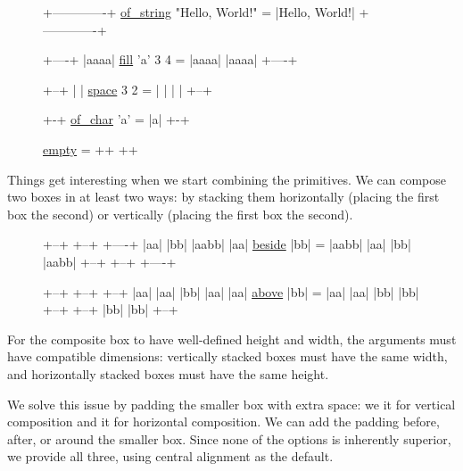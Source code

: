\documentclass{article}
\begin{document}
\begin{figure}
\begin{code}
                            +-------------+
\href{#ref-of-string}{of_string} "Hello, World!" = |Hello, World!|
                            +-------------+

               +----+
               |aaaa|
\href{#ref-fill}{fill} 'a' 3 4 = |aaaa|
               |aaaa|
               +----+

            +--+
            |  |
\href{#ref-space}{space} 3 2 = |  |
            |  |
            +--+

              +-+
\href{#ref-of-char}{of_char} 'a' = |a|
              +-+

\href{#ref-empty}{empty} = ++
        ++
\end{code}
\end{figure}

Things get interesting when we start combining the primitives.
We can compose two boxes in at least two ways:
by stacking them horizontally (placing the first box \href{#ref-beside}{} the second)
or vertically (placing the first box \href{#ref-above}{} the second).

\begin{figure}
\begin{code}
+--+        +--+   +----+
|aa|        |bb|   |aabb|
|aa| \href{#ref-beside}{beside} |bb| = |aabb|
|aa|        |bb|   |aabb|
+--+        +--+   +----+

                    +--+
+--+         +--+   |aa|
|aa|         |bb|   |aa|
|aa|  \href{#ref-above}{above}  |bb| = |aa|
|aa|         |bb|   |bb|
+--+         +--+   |bb|
                    |bb|
                    +--+
\end{code}
\end{figure}

For the composite box to have well-defined height and width, the arguments must have compatible dimensions:
vertically stacked boxes must have the same width, and horizontally stacked boxes must have the same height.

We solve this issue by padding the smaller box with extra space:
we \href{#ref-widen}{} it for vertical composition
and \href{#ref-heighten}{} it for horizontal composition.
We can add the padding before, after, or around the smaller box.
Since none of the options is inherently superior, we provide all three, using central alignment as the default.
\end{document}
